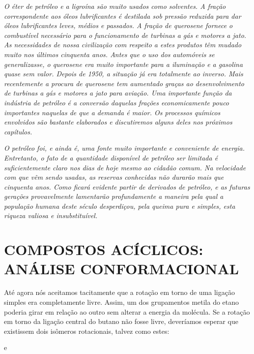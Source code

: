 \par\bigskip
\emph{O éter de petróleo e a ligroína são muito usados como solventes. A fração correspondente aos óleos lubrificantes é destilada sob pressão reduzida para dar óleos lubrificantes leves, médios e passados. A fração de querosene fornece o combustível necessário para o funcionamento de turbinas a gás e motores a jato. As necessidades de nossa civilização com respeito a estes produtos têm mudado muito nos últimos cinquenta anos. Antes que o uso dos automóveis se generalizasse, o querosene era muito importante para a iluminação e a gasolina quase sem valor. Depois de 1950, a situação já era totalmente ao inverso. Mais recentemente a procura de querosene tem aumentado graças ao desenvolvimento de turbinas a gás e motores a jato para aviação. Uma importante função da indústria de petróleo é a conversão daquelas frações economicamente pouco importantes naquelas de que a demanda é maior. Os processos químicos envolvidos são bastante elaborados e discutiremos alguns deles nos próximos capítulos.}

\emph{O petróleo foi, e ainda é, uma fonte muito importante e conveniente de energia. Entretanto, o fato de a quantidade disponível de petróleo ser limitada é suficientemente claro nos dias de hoje mesmo ao cidadão comum. Na velocidade com que vêm sendo usadas, as reservas conhecidas não durarão mais que cinquenta anos. Como ficará evidente partir de derivados de petróleo, e as futuras gerações provavelmente lamentarão profundamente a maneira pela qual a população humana deste século desperdiçou, pela queima pura e simples, esta riqueza valiosa e insubstituível.}
\par\bigskip

\section{COMPOSTOS ACÍCLICOS: ANÁLISE CONFORMACIONAL}
Até agora nós aceitamos tacitamente que a rotação em torno de uma ligação simples era completamente livre. Assim, um dos grupamentos metila do etano poderia girar em relação ao outro sem alterar a energia da molécula. Se a rotação em torno da ligação central do butano não fosse livre, deveríamos esperar que existissem dois isômeros rotacionais, talvez como estes: 

\begin{tightcenter}
    e
\end{tightcenter}

